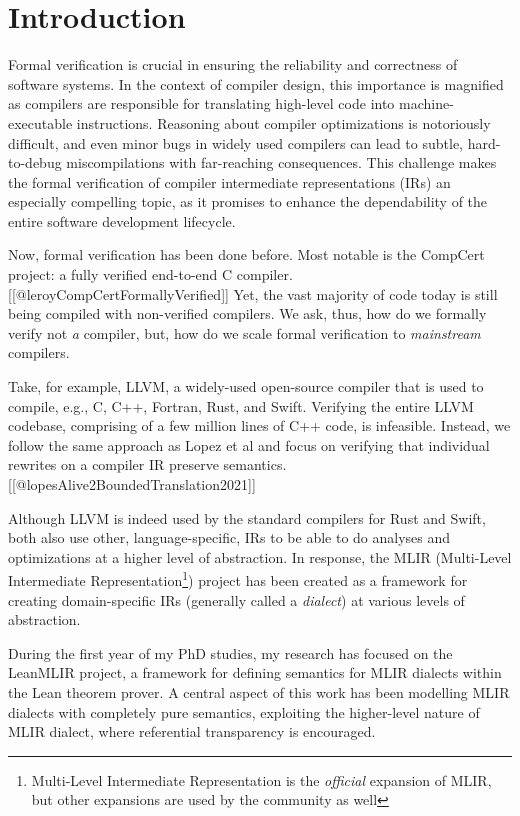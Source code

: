\documentclass[a4paper]{article}
\begin{document}
\section{Introduction}

Formal verification is crucial in ensuring the reliability and
correctness of software systems. In the context of compiler design, this
importance is magnified as compilers are responsible for translating
high-level code into machine-executable instructions. Reasoning about
compiler optimizations is notoriously difficult, and even minor bugs in
widely used compilers can lead to subtle, hard-to-debug miscompilations
with far-reaching consequences. This challenge makes the formal
verification of compiler intermediate representations (IRs) an
especially compelling topic, as it promises to enhance the dependability
of the entire software development lifecycle.

Now, formal verification has been done before. Most notable is the
CompCert project: a fully verified end-to-end C compiler.
{[}{[}@leroyCompCertFormallyVerified{]}{]} Yet, the vast majority of
code today is still being compiled with non-verified compilers. We ask,
thus, how do we formally verify not \emph{a} compiler, but, how do we
scale formal verification to \emph{mainstream} compilers.

Take, for example, LLVM, a widely-used open-source compiler that is used
to compile, e.g., C, C++, Fortran, Rust, and Swift. Verifying the entire
LLVM codebase, comprising of a few million lines of C++ code, is
infeasible. Instead, we follow the same approach as Lopez et al and
focus on verifying that individual rewrites on a compiler IR preserve
semantics. {[}{[}@lopesAlive2BoundedTranslation2021{]}{]}

Although LLVM is indeed used by the standard compilers for Rust and
Swift, both also use other, language-specific, IRs to be able to do
analyses and optimizations at a higher level of abstraction. In
response, the MLIR (Multi-Level Intermediate Representation\footnote{Multi-Level
  Intermediate Representation is the \emph{official} expansion of MLIR,
  but other expansions are used by the community as well}) project has
been created as a framework for creating domain-specific IRs (generally
called a \emph{dialect}) at various levels of abstraction.

During the first year of my PhD studies, my research has focused on the
LeanMLIR project, a framework for defining semantics for MLIR dialects
within the Lean theorem prover. A central aspect of this work has been
modelling MLIR dialects with completely pure semantics, exploiting the
higher-level nature of MLIR dialect, where referential transparency is
encouraged.
\end{document}
